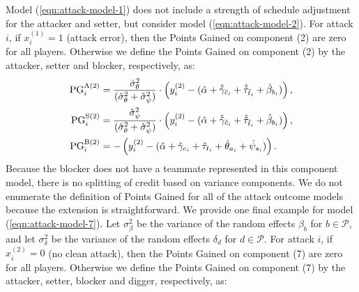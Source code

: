 \documentclass{article}
\begin{document}
Model (\ref{eqn:attack-model-1}) does not include a strength of schedule adjustment for the attacker and setter, but consider model (\ref{eqn:attack-model-2}). For attack $i$, if $x_i^{(1)} = 1$ (attack error), then the Points Gained on component (2) are zero for all players. Otherwise we define the Points Gained on component (2) by the attacker, setter and blocker, respectively, as:
\begin{align}
    \label{eqn:pg-attack-2}
    \begin{split}
        \mbox{PG}_i^{\mbox{\scriptsize A(2)}} &= \frac{\hat\sigma^2_\theta}{(\hat\sigma^2_\theta + \hat\sigma^2_\psi)} \cdot \left(y_i^{(2)} - (\hat\alpha + \hat{\tilde\gamma}_{\tilde c_i} + \hat{\tilde\tau}_{\tilde t_i} + \hat\beta_{b_i})\right),\\
        \mbox{PG}_i^{\mbox{\scriptsize S(2)}} &= \frac{\hat\sigma^2_\psi}{(\hat\sigma^2_\theta + \hat\sigma^2_\psi)} \cdot \left(y_i^{(2)} - (\hat\alpha + \hat{\tilde\gamma}_{\tilde c_i} + \hat{\tilde\tau}_{\tilde t_i} + \hat\beta_{b_i})\right),\\
        \mbox{PG}_i^{\mbox{\scriptsize B(2)}} &= -\left(y_i^{(2)} - (\hat\alpha + \hat\gamma_{c_i} + \hat\tau_{t_i} + \hat\theta_{a_i} + \hat\psi_{s_i})\right).
    \end{split}
\end{align}
Because the blocker does not have a teammate represented in this component model, there is no splitting of credit based on variance components. We do not enumerate the definition of Points Gained for all of the attack outcome models because the extension is straightforward. We provide one final example for model (\ref{eqn:attack-model-7}). Let $\sigma^2_\beta$ be the variance of the random effects $\beta_b$ for $b \in \mathcal{P}$, and let $\sigma^2_\delta$ be the variance of the random effects $\delta_d$ for $d \in \mathcal P$. For attack $i$, if $x_i^{(2)} = 0$ (no clean attack), then the Points Gained on component (7) are zero for all players. Otherwise we define the Points Gained on component (7) by the attacker, setter, blocker and digger, respectively, as:
\end{document}
